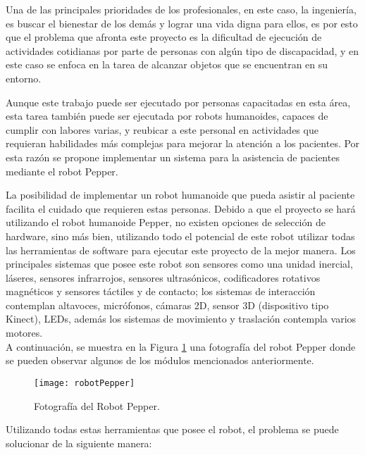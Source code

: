 Una de las principales prioridades de los profesionales, en este caso, la ingeniería, es buscar el bienestar de los
demás y lograr una vida digna para ellos, es por esto que el problema que afronta este proyecto es la dificultad de
ejecución de actividades cotidianas por parte de personas con algún tipo de discapacidad, y en este caso se enfoca
en la tarea de alcanzar objetos que se encuentran en su entorno. 

Aunque este trabajo puede ser ejecutado por personas capacitadas en esta área, esta tarea también puede ser ejecutada
por robots humanoides, capaces de cumplir con labores varias, y reubicar a este personal en actividades que requieran
habilidades más complejas para mejorar la atención a los pacientes. Por esta razón se propone implementar un sistema 
para la asistencia de pacientes mediante el robot Pepper.



La posibilidad de implementar un robot humanoide que pueda asistir al paciente facilita el cuidado que requieren
estas personas. Debido a que el proyecto se hará utilizando el robot humanoide Pepper, no existen opciones de 
selección de hardware, sino más bien, utilizando todo el potencial de este robot utilizar todas las herramientas
de software para ejecutar este proyecto de la mejor manera.  Los principales sistemas que posee este robot son
sensores como una unidad inercial, láseres, sensores infrarrojos, sensores ultrasónicos, codificadores rotativos 
magnéticos y sensores táctiles y de contacto; los sistemas de interacción contemplan altavoces, micrófonos, cámaras 2D,
sensor 3D (dispositivo tipo Kinect), LEDs, además los sistemas de movimiento y traslación contempla varios motores.\\
A continuación, se muestra en la Figura \ref{fig:RobotPepper} una fotografía del robot Pepper donde se pueden observar 
algunos de los módulos mencionados anteriormente. 
\vspace{0.2cm}


\begin{figure}[H]
	\centering
	\texttt{[image: robotPepper]}
	\caption{Fotografía del Robot Pepper. \cite{imagen_pepper} }
	\label{fig:RobotPepper}
\end{figure}


Utilizando todas estas herramientas que posee el robot, el problema se puede solucionar de la siguiente manera:

